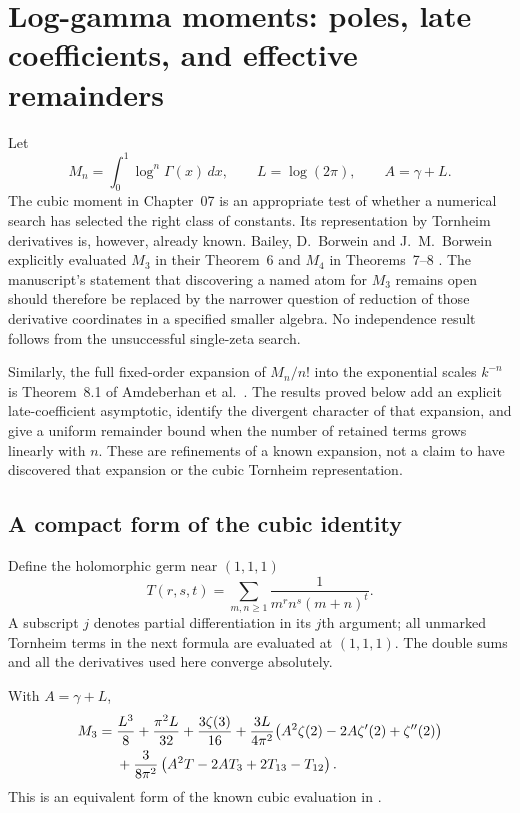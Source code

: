 \section{Log-gamma moments: poles, late coefficients, and effective remainders}
\label{sec:gamma}
Let
\[
 M_n=\int_0^1\log^n\Gamma(x)\,dx,\qquad L=\log(2\pi),\qquad A=\gamma+L.
\]
The cubic moment in Chapter~07 is an appropriate test of whether a numerical
search has selected the right class of constants.  Its representation by
Tornheim derivatives is, however, already known.  Bailey, D.~Borwein and
J.~M.~Borwein explicitly evaluated $M_3$ in their Theorem~6 and $M_4$ in
Theorems~7--8 \cite{BBB}.  The manuscript's statement that discovering a
named atom for $M_3$ remains open should therefore be replaced by the
narrower question of reduction of those derivative coordinates in a specified
smaller algebra.  No independence result follows from the unsuccessful
single-zeta search.

Similarly, the full fixed-order expansion of $M_n/n!$ into the exponential
scales $k^{-n}$ is Theorem~8.1 of Amdeberhan et al.\ \cite{ACEMKM}.
The results proved below add an explicit late-coefficient asymptotic, identify
the divergent character of that expansion, and give a uniform remainder
bound when the number of retained terms grows linearly with $n$.
These are refinements of a known expansion, not a claim to have discovered
that expansion or the cubic Tornheim representation.

\subsection{A compact form of the cubic identity}
Define the holomorphic germ near $(1,1,1)$
\[
 T(r,s,t)=\sum_{m,n\ge1}\frac{1}{m^r n^s(m+n)^t}.
\]
A subscript $j$ denotes partial differentiation in its $j$th argument;
all unmarked Tornheim terms in the next formula are evaluated at $(1,1,1)$.
The double sums and all the derivatives used here converge absolutely.

\begin{theorem}
\label{thm:cubic-compact}
With $A=\gamma+L$,
\begin{align}
 M_3={}&\frac{L^3}{8}+\frac{\pi^2L}{32}+\frac{3\zeta(3)}{16}
 +\frac{3L}{4\pi^2}
 \bigl(A^2\zeta(2)-2A\zeta'(2)+\zeta''(2)\bigr)\notag\\
 &+\frac{3}{8\pi^2}
 \left(A^2T-2AT_3+2T_{13}-T_{12}\right).
 \label{eq:cubic-compact}
\end{align}
This is an equivalent form of the known cubic evaluation in
\cite[Theorem~6]{BBB}.
\end{theorem}

